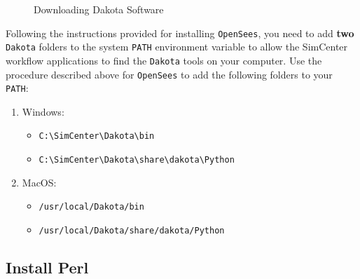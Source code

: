 \begin{figure}[!htbp]
  \caption{Downloading Dakota Software}
  \label{fig:dakota_installation}
\end{figure}

Following the instructions provided for installing \texttt{OpenSees}, you need to add \textbf{two} \texttt{Dakota} folders to the
system \texttt{PATH} environment variable to allow the SimCenter
workflow applications to find the \texttt{Dakota} tools on your computer. Use
the procedure described above for \texttt{OpenSees} to add the following
folders to your \texttt{PATH}:

\begin{enumerate}
\item Windows:
\begin{itemize}
    \item \texttt{C:\textbackslash SimCenter\textbackslash Dakota\textbackslash bin}
    \item \texttt{C:\textbackslash SimCenter\textbackslash Dakota\textbackslash share\textbackslash dakota\textbackslash Python}
\end{itemize}

\item MacOS:
\begin{itemize}
    \item \texttt{/usr/local/Dakota/bin}
    \item \texttt{/usr/local/Dakota/share/dakota/Python}
\end{itemize}
\end{enumerate}
\subsection{Install  Perl}

